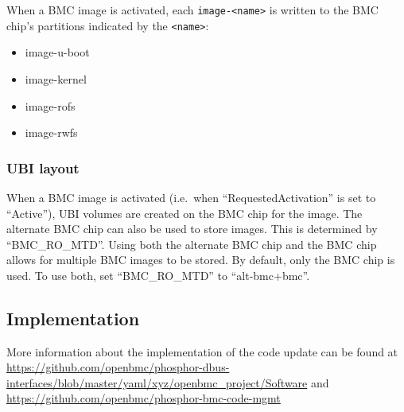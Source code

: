 When a BMC image is activated, each
\texttt{image-\textless{}name\textgreater{}} is written to the BMC
chip's partitions indicated by the
\texttt{\textless{}name\textgreater{}}:

\begin{itemize}
\tightlist
\item
  image-u-boot
\item
  image-kernel
\item
  image-rofs
\item
  image-rwfs
\end{itemize}

\hypertarget{ubi-layout}{%
\subsubsection{UBI layout}\label{ubi-layout}}

When a BMC image is activated (i.e.~when ``RequestedActivation'' is set
to ``Active''), UBI volumes are created on the BMC chip for the image.
The alternate BMC chip can also be used to store images. This is
determined by ``BMC\_RO\_MTD''. Using both the alternate BMC chip and
the BMC chip allows for multiple BMC images to be stored. By default,
only the BMC chip is used. To use both, set ``BMC\_RO\_MTD'' to
``alt-bmc+bmc''.

\hypertarget{implementation}{%
\subsection{Implementation}\label{implementation}}

More information about the implementation of the code update can be
found at
\url{https://github.com/openbmc/phosphor-dbus-interfaces/blob/master/yaml/xyz/openbmc_project/Software}
and \url{https://github.com/openbmc/phosphor-bmc-code-mgmt}
